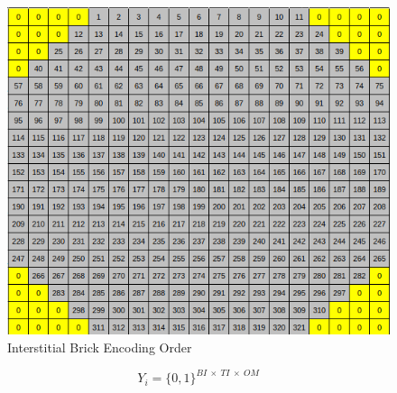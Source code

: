 \begin{figure}[t]
	\centering
	\includegraphics[scale=0.35]{Figures/inter_channel_numbers.png}
	\caption{Interstitial Brick Encoding Order}
	\label{fig:inter_order}
\end{figure}

\noindent


\begin{equation} \label{instance_result_matrix}
	Y_i = \{0, 1\}^{BI \ \times \ TI \ \times \ OM}
\end{equation}


